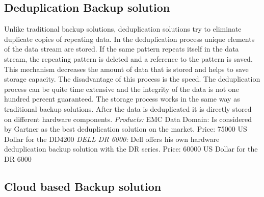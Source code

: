 \documentclass[12pt]{article}
\begin{document}
\subsection{Deduplication Backup solution}
Unlike traditional backup solutions, deduplication solutions try to eliminate duplicate copies of repeating data. In the deduplication process unique elements of the data stream are stored. If the same pattern repeats itself in the data stream, the repeating pattern is deleted and a reference to the  pattern is saved. This mechanism decreases the amount of data that is stored and helps to save storage capacity. The disadvantage of this process is the speed. The deduplication process can be quite time extensive and the integrity of the data is not one hundred percent guaranteed. The storage process works in the same way as traditional backup solutions. After the data is deduplicated it is directly stored on different hardware components.
\newline
\newline
\emph{Products:}
\newline
EMC Data Domain:
\newline
Is considered by Gartner as the best deduplication solution on the market.
\newline
\newline
Price: 75000 US Dollar for the DD4200
\newline
\newline
\emph{DELL DR 6000:}
\newline
Dell offers his own hardware deduplication backup solution with the DR series.
\newline
\newline
Price: 60000 US Dollar for the DR 6000 
\subsection{Cloud based Backup solution}
\end{document}
